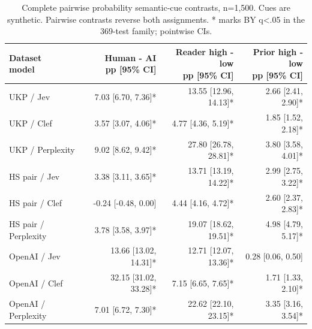 \begin{table}[t]
\centering\footnotesize
\setlength{\tabcolsep}{3.5pt}
\begin{tabular}{@{}lrrr@{}}
\toprule
\shortstack[l]{Dataset\\{}model} & \shortstack[l]{Human - AI\\{}pp [95\% CI]} & \shortstack[l]{Reader high - low\\{}pp [95\% CI]} & \shortstack[l]{Prior high - low\\{}pp [95\% CI]} \\
\midrule
UKP / Jev & 7.03 [6.70, 7.36]* & 13.55 [12.96, 14.13]* & 2.66 [2.41, 2.90]* \\
UKP / Clef & 3.57 [3.07, 4.06]* & 4.77 [4.36, 5.19]* & 1.85 [1.52, 2.18]* \\
UKP / Perplexity & 9.02 [8.62, 9.42]* & 27.80 [26.78, 28.81]* & 3.80 [3.58, 4.01]* \\
HS pair / Jev & 3.38 [3.11, 3.65]* & 13.71 [13.19, 14.22]* & 2.99 [2.75, 3.22]* \\
HS pair / Clef & -0.24 [-0.48, 0.00] & 4.44 [4.16, 4.72]* & 2.60 [2.37, 2.83]* \\
HS pair / Perplexity & 3.78 [3.58, 3.97]* & 19.07 [18.62, 19.51]* & 4.98 [4.79, 5.17]* \\
OpenAI / Jev & 13.66 [13.02, 14.31]* & 12.71 [12.07, 13.36]* & 0.28 [0.06, 0.50] \\
OpenAI / Clef & 32.15 [31.02, 33.28]* & 7.15 [6.65, 7.65]* & 1.71 [1.33, 2.10]* \\
OpenAI / Perplexity & 7.01 [6.72, 7.30]* & 22.62 [22.10, 23.15]* & 3.35 [3.16, 3.54]* \\
\bottomrule
\end{tabular}
\caption{Complete pairwise probability semantic-cue contrasts, n=1,500. Cues are synthetic. Pairwise contrasts reverse both assignments. * marks BY q<.05 in the 369-test family; pointwise CIs.}
\label{tab:appendix_pair_semantic}
\end{table}
